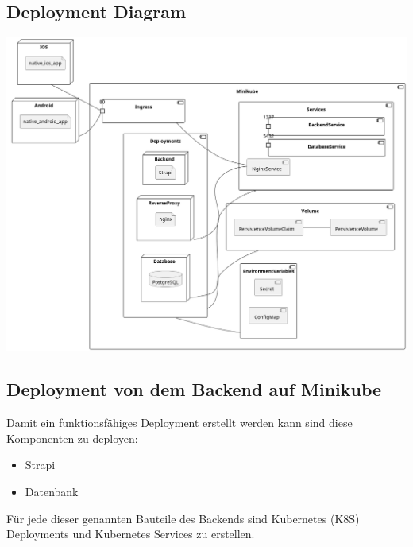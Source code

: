 



\subsection{Deployment Diagram}
\begin{center}
  \includegraphics[width=\textwidth]{pics/dev-deployment.png}
\end{center}
\subsection{Deployment von dem Backend auf Minikube}

Damit ein funktionsfähiges Deployment erstellt werden kann sind diese Komponenten zu deployen:
\begin{itemize}
  \item Strapi
  \item Datenbank
\end{itemize}

Für jede dieser genannten Bauteile des Backends sind Kubernetes (K8S) Deployments und Kubernetes Services zu erstellen.

